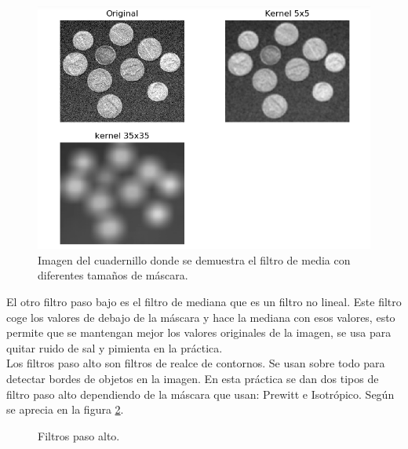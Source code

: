 \documentclass[a4paper,12pt]{report}
\begin{document}
\begin{figure}[h]
\centering
\includegraphics[width=1\textwidth]{imagenes/filtromedia}
\caption{Imagen del cuadernillo donde se demuestra el filtro de media con diferentes tamaños de máscara.}
\label{filtromedia}
\end{figure}

El otro filtro paso bajo es el filtro de mediana que es un filtro no lineal. Este filtro coge los valores de debajo de la máscara y  hace la mediana con esos valores, esto permite que se mantengan mejor los valores originales de la imagen, se usa para quitar ruido de sal y pimienta en la práctica.\\

Los filtros paso alto son filtros de realce de contornos. Se usan sobre todo para detectar bordes de objetos en la imagen. En esta práctica se dan dos tipos de filtro paso alto dependiendo de la máscara que usan: Prewitt e Isotrópico. Según se aprecia en la figura \ref{fpa}.

\begin{figure}[!tbp]
  \centering
  \hfill
  \caption{Filtros paso alto.}
  \label{fpa}
\end{figure}
\end{document}
